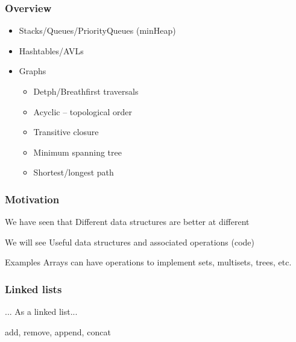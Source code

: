 \documentclass[aspectratio=169]{beamer}
\begin{document}
\frame[plain]{\titlepage}


\begin{frame}[t]\frametitle{Overview}

  \begin{itemize}
    \item Stacks/Queues/PriorityQueues (\alert{minHeap})
    \item Hashtables/AVLs
    \item Graphs
    \begin{itemize}
      \item Detph/Breathfirst traversals
      \item Acyclic -- topological order
      \item Transitive closure
      \item Minimum spanning tree
      \item Shortest/longest path
    \end{itemize}
  \end{itemize}


\end{frame}


\begin{frame}\frametitle{Motivation}
  \centering

  \begin{block}{We have seen that}
    Different \alert{data structures} are better at different 
  \end{block}

  \begin{block}{We will see}
    Useful data structures and associated operations (code)
  \end{block}

  \begin{exampleblock}{Examples}
    Arrays can have operations to implement sets, multisets, trees, etc.
  \end{exampleblock}

\end{frame}


\begin{frame}\frametitle{Linked lists}
  
  ... As a linked list...

  add, remove, append, concat
  
\end{frame}
\end{document}
